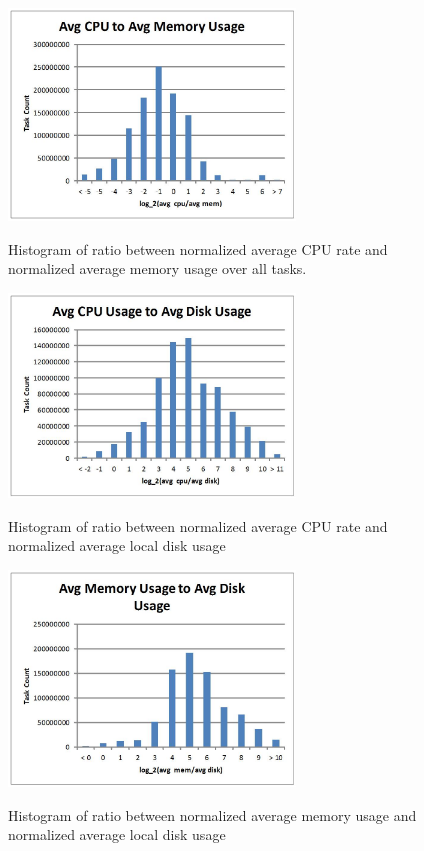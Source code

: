\documentclass{sig-alternate}
\begin{document}

\begin{figure}
\centering
\includegraphics[width=3in]{../figures/avg_act_cpu_mem.jpg}
\label{avg_act_cpu_mem}
\caption{Histogram of ratio between normalized average CPU rate and normalized average memory usage over all tasks.}
\end{figure}

\begin{figure}
\centering
\includegraphics[width=3in]{../figures/avg_act_cpu_disk.jpg}
\label{avg_act_cpu_disk}
\caption{Histogram of ratio between normalized average CPU rate and normalized average local disk usage}
\end{figure}

\begin{figure}
\centering
\includegraphics[width=3in]{../figures/avg_act_mem_disk.jpg}
\label{avg_act_mem_disk}
\caption{Histogram of ratio between normalized average memory usage and normalized average local disk usage}
\end{figure}
\end{document}
